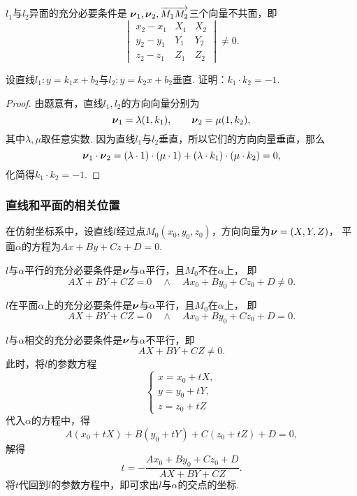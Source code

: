 \(l_1\)与\(l_2\)异面的充分必要条件是
\(\boldsymbol{\nu}_1,\boldsymbol{\nu}_2,\overrightarrow{M_1 M_2}\)三个向量不共面，即\[
	\begin{vmatrix}
		x_2 - x_1 & X_1 & X_2 \\
		y_2 - y_1 & Y_1 & Y_2 \\
		z_2 - z_1 & Z_1 & Z_2
	\end{vmatrix} \neq 0.
\]

\begin{example}
设直线\(l_1: y=k_1 x+b_2\)与\(l_2: y=k_2 x+b_2\)垂直.
证明：\(k_1 \cdot k_2 = -1\).
\begin{proof}
由题意有，直线\(l_1,l_2\)的方向向量分别为\[
	\boldsymbol{\nu}_1 = \lambda (1,k_1), \qquad
	\boldsymbol{\nu}_2 = \mu (1,k_2),
\]
其中\(\lambda,\mu\)取任意实数.
因为直线\(l_1\)与\(l_2\)垂直，所以它们的方向向量垂直，那么\[
	\boldsymbol{\nu}_1\cdot\boldsymbol{\nu}_2
	= (\lambda \cdot 1) \cdot (\mu \cdot 1)
	+ (\lambda \cdot k_1) \cdot (\mu \cdot k_2) = 0,
\]
化简得\(k_1 \cdot k_2 = -1\).
\end{proof}
\end{example}

\subsubsection{直线和平面的相关位置}
在仿射坐标系中，设直线\(l\)经过点\(M_0(x_0,y_0,z_0)\)，方向向量为\(\boldsymbol{\nu}=(X,Y,Z)\)，
平面\(\alpha\)的方程为\(A x + B y + C z + D = 0\).

\(l\)与\(\alpha\)平行的充分必要条件是\(\boldsymbol{\nu}\)与\(\alpha\)平行，且\(M_0\)不在\(\alpha\)上，
即\[
	AX+BY+CZ=0
	\quad\land\quad
	Ax_0+By_0+Cz_0+D\neq0.
\]

\(l\)在平面\(\alpha\)上的充分必要条件是\(\boldsymbol{\nu}\)与\(\alpha\)平行，且\(M_0\)在\(\alpha\)上，
即\[
	AX+BY+CZ=0
	\quad\land\quad
	Ax_0+By_0+Cz_0+D=0.
\]

\(l\)与\(\alpha\)相交的充分必要条件是\(\boldsymbol{\nu}\)与\(\alpha\)不平行，即\[
	AX+BY+CZ\neq0.
\]
此时，将\(l\)的参数方程\[
	\left\{ \begin{array}{l}
		x = x_0 + tX, \\
		y = y_0 + tY, \\
		z = z_0 + tZ
	\end{array} \right.
\]
代入\(\alpha\)的方程中，得\[
	A(x_0+tX) + B(y_0+tY) + C(z_0+tZ) + D = 0,
\]
解得\begin{equation}
	t = - \frac{Ax_0+By_0+Cz_0+D}{AX+BY+CZ}.
\end{equation}
将\(t\)代回到\(l\)的参数方程中，即可求出\(l\)与\(\alpha\)的交点的坐标.

